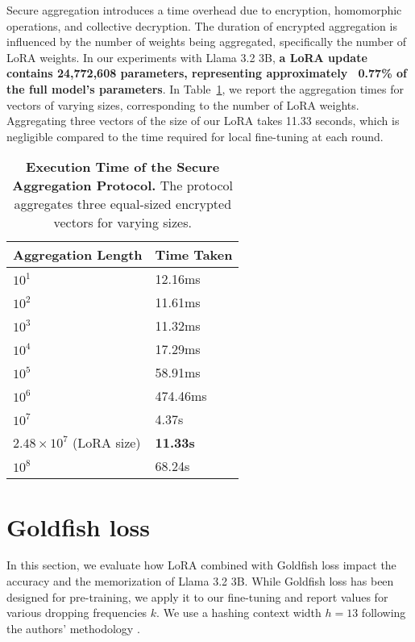 Secure aggregation introduces a time overhead due to encryption, homomorphic operations, and collective decryption. The duration of encrypted aggregation is influenced by the number of weights being aggregated, specifically the number of LoRA weights. In our experiments with Llama 3.2 3B, \textbf{a LoRA update contains 24,772,608 parameters, representing approximately ~0.77\% of the full model’s parameters}. In Table~\ref{tab:secagg}, we report the aggregation times for vectors of varying sizes, corresponding to the number of LoRA weights. Aggregating three vectors of the size of our LoRA takes 11.33 seconds, which is negligible compared to the time required for local fine-tuning at each round.

\begin{table}[ht]
\caption{\textbf{Execution Time of the Secure Aggregation Protocol.} The protocol aggregates three equal-sized encrypted vectors for varying sizes.}
\label{tab:secagg}
\vskip 0.15in
\begin{center}
\begin{scriptsize}
\begin{tabular}{@{}l|l@{}}
\toprule
\textbf{Aggregation Length} & \textbf{Time Taken} \\ \midrule
\(10^1\)                    & 12.16ms             \\
\(10^2\)                    & 11.61ms             \\
\(10^3\)                    & 11.32ms             \\
\(10^4\)                    & 17.29ms             \\
\(10^5\)                    & 58.91ms             \\
\(10^6\)                    & 474.46ms            \\
\(10^7\)                    & 4.37s               \\
\(2.48 \times 10^7\) (LoRA size) & \textbf{11.33s}  \\
\(10^8\)                    & 68.24s              \\ 
\bottomrule
\end{tabular}
\end{scriptsize}
\end{center}
\vskip -0.1in
\end{table}

\section{Goldfish loss}
\label{sec:goldfish}
In this section, we evaluate how LoRA combined with Goldfish loss impact the accuracy and the memorization of Llama 3.2 3B. While Goldfish loss has been designed for pre-training, we apply it to our fine-tuning and report values for various dropping frequencies $k$. We use a hashing context width $h=13$ following the authors' methodology \citep{hans2024goldfish}.

